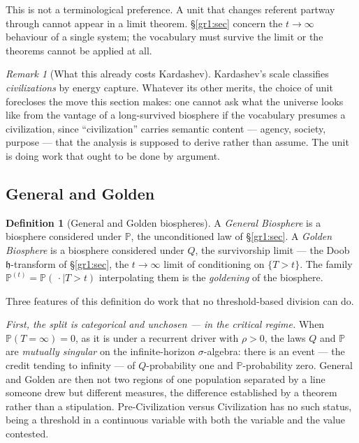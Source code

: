 \documentclass[11pt]{article}
\numberwithin{equation}{section}
\theoremstyle{plain}
\theoremstyle{definition}
\newtheorem{definition}[theorem]{Definition}
\theoremstyle{remark}
\newtheorem{remark}[theorem]{Remark}
\newcommand{\PP}{\mathbb{P}}
\newcommand{\hm}{\mathfrak{h}}
\begin{document}
This is not a terminological preference. A unit that changes referent
partway through cannot appear in a limit theorem. \S\ref{gr1:sec} concern
the $t\to\infty$ behaviour of a single system; the vocabulary must
survive the limit or the theorems cannot be applied at all.

\begin{remark}[What this already costs Kardashev]\label{gr:rem:kardvocab}
Kardashev's scale \cite{Kar64} classifies \emph{civilizations} by energy
capture. Whatever its other merits, the choice of unit forecloses the
move this section makes: one cannot ask what the universe looks like
from the vantage of a long-survived biosphere if the vocabulary presumes
a civilization, since ``civilization'' carries semantic content ---
agency, society, purpose --- that the analysis is supposed to derive
rather than assume. The unit is doing work that ought to be done by
argument.
\end{remark}

\subsection{General and Golden}\label{gr:sub:generalgolden}

\begin{definition}[General and Golden biospheres]\label{gr:def:gg}
A \emph{General Biosphere} is a biosphere considered under $\PP$, the
unconditioned law of \S\ref{gr1:sec}. A \emph{Golden Biosphere} is a biosphere
considered under $Q$, the survivorship limit --- the Doob $\hm$-transform
of \S\ref{gr1:sec}, the $t\to\infty$ limit of conditioning on $\{T>t\}$. The
family $\PP^{(t)}=\PP(\,\cdot\mid T>t)$ interpolating them is the
\emph{goldening} of the biosphere.
\end{definition}

Three features of this definition do work that no threshold-based
division can do.

\emph{First, the split is categorical and unchosen --- in the critical
regime.} When $\PP(T=\infty)=0$, as it is under a recurrent driver with
$\rho>0$, the laws $Q$ and $\PP$ are \emph{mutually singular} on the
infinite-horizon $\sigma$-algebra: there is an event --- the credit
tending to infinity --- of $Q$-probability one and $\PP$-probability
zero. General and Golden are then not two regions of one population
separated by a line someone drew but different measures, the difference
established by a theorem rather than a stipulation. Pre-Civilization
versus Civilization has no such status, being a threshold in a
continuous variable with both the variable and the value contested.
\end{document}
